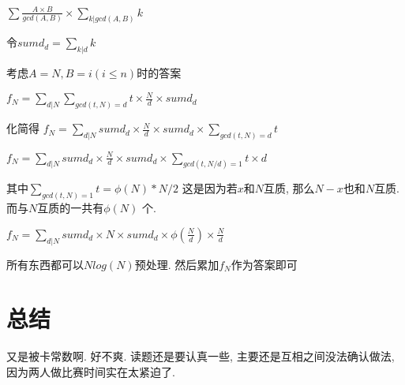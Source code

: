 \documentclass[a4paper, 11pt, nofonts, nocap, fancyhdr]{ctexart}
\begin{document}
$\sum \frac{A\times B}{gcd(A,B)}\times\sum\limits_{k|gcd(A,B)} k$

令$sumd_d = \sum\limits_{k|d} k$

考虑$A=N, B=i(i \leq n)$时的答案

$f_N = \sum\limits_{d|N} \sum\limits_{gcd(t, N) = d} t \times \frac{N}{d} \times sumd_d$

化简得 $f_N = \sum\limits_{d|N} sumd_d \times \frac{N}{d} \times sumd_d \times \sum\limits_{gcd(t, N) = d} t$

$f_N = \sum\limits_{d|N} sumd_d \times \frac{N}{d} \times sumd_d \times \sum\limits_{gcd(t, N/d) = 1} t \times d$

其中$\sum\limits_{gcd(t, N) = 1} t = \phi(N)*N/2$ 这是因为若$x$和$N$互质, 那么$N-x$也和$N$互质. 而与$N$互质的一共有$\phi(N)$ 个.

$f_N = \sum\limits_{d|N} sumd_d \times N \times sumd_d \times \phi(\frac{N}{d}) \times \frac{N}{d}$

所有东西都可以$Nlog(N)$预处理. 然后累加$f_N$作为答案即可

\section{总结}

又是被卡常数啊. 好不爽. 读题还是要认真一些, 主要还是互相之间没法确认做法, 因为两人做比赛时间实在太紧迫了.
\end{document}
